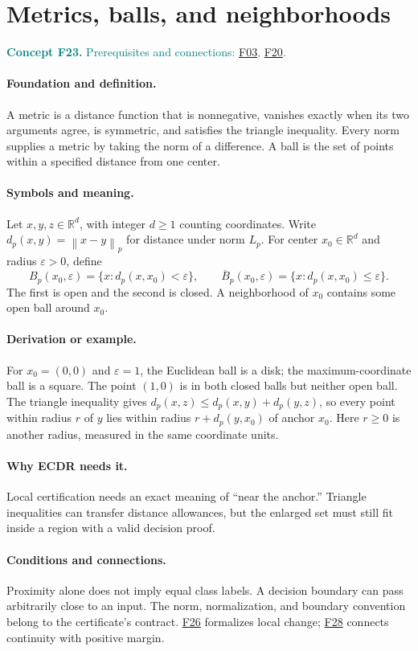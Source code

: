 \documentclass[11pt,a4paper]{article}
\newcommand{\R}{\mathbb R}
\newcommand{\norm}[1]{\left\lVert#1\right\rVert}
\newcommand{\conceptid}{Front matter}
\newcommand{\concept}[3]{\clearpage\renewcommand{\conceptid}{#1}%
\section{#2}\label{concept:#1}%
\textcolor{teal}{\textbf{Concept #1.} Prerequisites and connections: #3.}\par
\typeout{ECDR-CONCEPT-START #1 PAGE=\thepage}}
\begin{document}
\concept{F23}{Metrics, balls, and neighborhoods}{\hyperref[concept:F03]{F03}, \hyperref[concept:F20]{F20}}
\paragraph{Foundation and definition.}
A metric is a distance function that is nonnegative, vanishes exactly
when its two arguments agree, is symmetric, and satisfies the triangle
inequality. Every norm supplies a metric by taking the norm of a
difference. A ball is the set of points within a specified distance
from one center.
\paragraph{Symbols and meaning.}
Let $x,y,z\in\R^d$, with integer $d\ge1$ counting coordinates.
Write $d_p(x,y)=\norm{x-y}_p$ for distance under norm $L_p$.
For center $x_0\in\R^d$ and radius $\varepsilon>0$, define
\[
 B_p(x_0,\varepsilon)=\{x:d_p(x,x_0)<\varepsilon\},\qquad
 \overline B_p(x_0,\varepsilon)=\{x:d_p(x,x_0)\le\varepsilon\}.
\]
The first is open and the second is closed. A neighborhood of $x_0$
contains some open ball around $x_0$.
\paragraph{Derivation or example.}
For $x_0=(0,0)$ and $\varepsilon=1$, the Euclidean ball is a disk;
the maximum-coordinate ball is a square. The point $(1,0)$ is in both
closed balls but neither open ball. The triangle inequality gives
$d_p(x,z)\le d_p(x,y)+d_p(y,z)$, so every point within radius
$r$ of $y$ lies within radius $r+d_p(y,x_0)$ of anchor $x_0$.
Here $r\ge0$ is another radius, measured in the same coordinate units.
\paragraph{Why ECDR needs it.}
Local certification needs an exact meaning of ``near the anchor.''
Triangle inequalities can transfer distance allowances, but the enlarged
set must still fit inside a region with a valid decision proof.
\paragraph{Conditions and connections.}
Proximity alone does not imply equal class labels. A decision boundary
can pass arbitrarily close to an input. The norm, normalization, and
boundary convention belong to the certificate's contract. \hyperref[concept:F26]{F26} formalizes
local change; \hyperref[concept:F28]{F28} connects continuity with positive margin.
\par\label{endconcept:F23}
\end{document}
